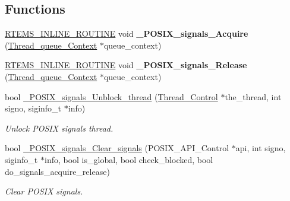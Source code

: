 \subsection*{Functions}
\begin{DoxyCompactItemize}
\item 
\mbox{\label{group__POSIX__SIGNALS_gaed33464be8fad528f3c52f2bb1e6f973}} 
\mbox{\hyperlink{group__RTEMSScoreBaseDefs_gac216239df231d5dbd15e3520b0b9313f}{R\+T\+E\+M\+S\+\_\+\+I\+N\+L\+I\+N\+E\+\_\+\+R\+O\+U\+T\+I\+NE}} void {\bfseries \+\_\+\+P\+O\+S\+I\+X\+\_\+signals\+\_\+\+Acquire} (\mbox{\hyperlink{structThread__queue__Context}{Thread\+\_\+queue\+\_\+\+Context}} $\ast$queue\+\_\+context)
\item 
\mbox{\label{group__POSIX__SIGNALS_ga3ecb9c45e9caed87553068a70252232e}} 
\mbox{\hyperlink{group__RTEMSScoreBaseDefs_gac216239df231d5dbd15e3520b0b9313f}{R\+T\+E\+M\+S\+\_\+\+I\+N\+L\+I\+N\+E\+\_\+\+R\+O\+U\+T\+I\+NE}} void {\bfseries \+\_\+\+P\+O\+S\+I\+X\+\_\+signals\+\_\+\+Release} (\mbox{\hyperlink{structThread__queue__Context}{Thread\+\_\+queue\+\_\+\+Context}} $\ast$queue\+\_\+context)
\item 
\mbox{\label{group__POSIX__SIGNALS_ga4863c006d4abcface6e2fc9821c00d13}} 
bool \mbox{\hyperlink{group__POSIX__SIGNALS_ga4863c006d4abcface6e2fc9821c00d13}{\+\_\+\+P\+O\+S\+I\+X\+\_\+signals\+\_\+\+Unblock\+\_\+thread}} (\mbox{\hyperlink{struct__Thread__Control}{Thread\+\_\+\+Control}} $\ast$the\+\_\+thread, int signo, siginfo\+\_\+t $\ast$info)
\begin{DoxyCompactList}\small\item\em Unlock P\+O\+S\+IX signals thread. \end{DoxyCompactList}\item 
\mbox{\label{group__POSIX__SIGNALS_gaf6c9fcc7ad91c06f45e1adcd1a4b1f67}} 
bool \mbox{\hyperlink{group__POSIX__SIGNALS_gaf6c9fcc7ad91c06f45e1adcd1a4b1f67}{\+\_\+\+P\+O\+S\+I\+X\+\_\+signals\+\_\+\+Clear\+\_\+signals}} (P\+O\+S\+I\+X\+\_\+\+A\+P\+I\+\_\+\+Control $\ast$api, int signo, siginfo\+\_\+t $\ast$info, bool is\+\_\+global, bool check\+\_\+blocked, bool do\+\_\+signals\+\_\+acquire\+\_\+release)
\begin{DoxyCompactList}\small\item\em Clear P\+O\+S\+IX signals. \end{DoxyCompactList}\item 

\end{DoxyCompactItemize}
